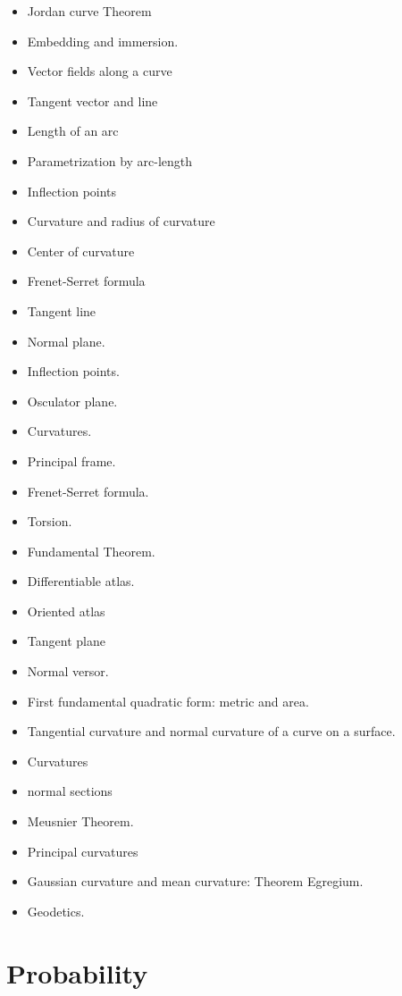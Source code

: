 \documentclass[10pt]{article}
\begin{document}
\begin{itemize}
	\item Jordan curve Theorem
	\item Embedding and immersion. 
	\item Vector fields along a curve
	\item Tangent vector and line
	\item Length of an arc
	\item Parametrization by arc-length
	\item Inflection points
	\item Curvature and radius of curvature
	\item Center of curvature
	\item Frenet-Serret formula
	\item Tangent line
	\item Normal plane.
	\item Inflection points.
	\item Osculator plane.
	\item Curvatures.
	\item Principal frame.
	\item Frenet-Serret formula.
	\item Torsion.
	\item Fundamental Theorem.
	\item Differentiable atlas.
	\item Oriented atlas
	\item Tangent plane
	\item Normal versor.
	\item First fundamental quadratic form: metric and area.
	\item Tangential curvature and normal curvature of a curve on a surface.
	\item Curvatures
	\item normal sections
	\item Meusnier Theorem.
	\item Principal curvatures
	\item Gaussian curvature and mean curvature: Theorem Egregium.
	\item Geodetics. 
\end{itemize}
\begin{refsection}
	\nocite{book:geometricalMethods}
	\nocite{do1994differential}
	\nocite{do2017differential}
	\printbibliography[heading=subbibliography]
\end{refsection}

\section{Probability}
\end{document}
